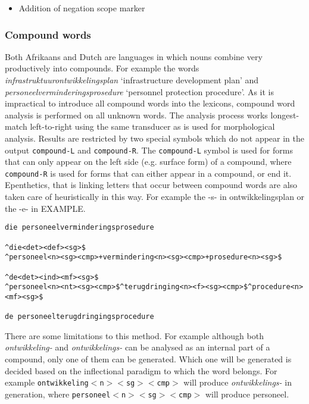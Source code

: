 \documentclass[11pt]{article}
\begin{document}
\begin{itemize}
\item Addition of negation scope marker
\end{itemize}


\subsubsection{Compound words}


Both Afrikaans and Dutch are languages in which nouns combine very
productively into compounds. For example the words {\em infrastruktuurontwikkelingsplan}
`infrastructure development plan' and {\em personeelverminderingsprosedure}
`personnel protection procedure'. As it is impractical to introduce
all compound words into the lexicons, compound word analysis is performed on
all unknown words. The analysis process works longest-match left-to-right
using the same transducer as is used for morphological analysis.
Results are restricted by two special
symbols which do not appear in the output {\small {\tt compound-L}} and {\small {\tt compound-R}}.
The {\small {\tt compound-L}} symbol is used for forms that can only appear on the
left side (e.g. surface form) of a compound, where {\small {\tt compound-R}} is
used for forms that can either appear in a compound, or end it.
Epenthetics, that is linking letters that occur between compound words
are also taken care of heuristically in this way. For example the -s-
in ontwikkelingsplan or the -e- in EXAMPLE.


\begin{figure*}
\begin{small}
\begin{verbatim}
die personeelverminderingsprosedure

^die<det><def><sg>$
^personeel<n><sg><cmp>+vermindering<n><sg><cmp>+prosedure<n><sg>$

^de<det><ind><mf><sg>$
^personeel<n><nt><sg><cmp>$^terugdringing<n><f><sg><cmp>$^procedure<n><mf><sg>$

de personeelterugdringingsprocedure
\end{verbatim}
\end{small}
\end{figure*}

There are some limitations to this method. For example although
both {\em ontwikkeling-} and {\em ontwikkelings-} can be analysed as an internal part
of a compound, only one of them can be generated. Which one will be generated
is decided based on the inflectional paradigm to which the word belongs. For
example {\small {\tt ontwikkeling$<$n$><$sg$><$cmp$>$}} will produce {\em ontwikkelings-} in generation,
where {\small {\tt personeel$<$n$><$sg$><$cmp$>$}} will produce personeel.
\end{document}
